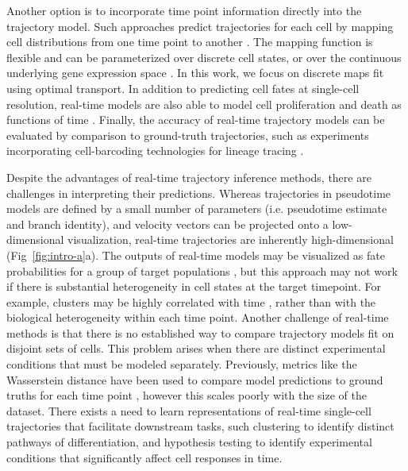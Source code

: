Another option is to incorporate time point information directly into the trajectory model. Such approaches predict trajectories for each cell by mapping cell distributions from one time point to another \citep{lavenantMathematicalTheoryTrajectory2021}. The mapping function is flexible and can be parameterized over discrete cell states, \citep{schiebingerOptimalTransportAnalysisSingleCell2019} or over the continuous underlying gene expression space \citep{tongTrajectoryNetDynamicOptimal2020}. In this work, we focus on discrete maps fit using optimal transport. In addition to predicting cell fates at single-cell resolution, real-time models are also able to model cell proliferation and death as functions of time \citep{schiebingerOptimalTransportAnalysisSingleCell2019}. Finally, the accuracy of real-time trajectory models can be evaluated by comparison to ground-truth trajectories, such as experiments incorporating cell-barcoding technologies for lineage tracing \citep{weinrebLineageTracingTranscriptional2020a}.

Despite the advantages of real-time trajectory inference methods, there are challenges in interpreting their predictions. Whereas trajectories in pseudotime models are defined by a small number of parameters (i.e. pseudotime estimate and branch identity), and velocity vectors can be projected onto a low-dimensional visualization, real-time trajectories are inherently high-dimensional (Fig~\ref{fig:intro-a}a). The outputs of real-time models may be visualized as fate probabilities for a group of target populations \citep{kleinMappingCellsTime2023a}, but this approach may not work if there is substantial heterogeneity in cell states at the target timepoint. For example, clusters may be highly correlated with time \citep{kurdEarlyPrecursorsMolecular2020}, rather than with the biological heterogeneity within each time point. Another challenge of real-time methods is that there is no established way to compare trajectory models fit on disjoint sets of cells. This problem arises when there are distinct experimental conditions that must be modeled separately. Previously, metrics like the Wasserstein distance have been used to compare model predictions to ground truths for each time point \citep{yeoGenerativeModelingSinglecell2021}, however this scales poorly with the size of the dataset. There exists a need to learn representations of real-time single-cell trajectories that facilitate downstream tasks, such clustering to identify distinct pathways of differentiation, and hypothesis testing to identify experimental conditions that significantly affect cell responses in time.

